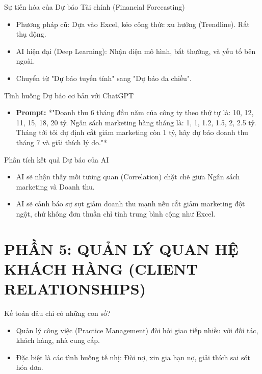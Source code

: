 \documentclass[aspectratio=169]{beamer}
\begin{document}
\begin{frame}{Sự tiến hóa của Dự báo Tài chính (Financial Forecasting)}
    \begin{itemize}
        \item Phương pháp cũ: Dựa vào Excel, kéo công thức xu hướng (Trendline). Rất thụ động.
        \item AI hiện đại (Deep Learning): Nhận diện mô hình, bất thường, và yếu tố bên ngoài.
        \item Chuyển từ "Dự báo tuyến tính" sang "Dự báo đa chiều".
    \end{itemize}
\end{frame}


\begin{frame}{Tình huống Dự báo cơ bản với ChatGPT}
    \begin{itemize}
        \item \textbf{Prompt:} *"Doanh thu 6 tháng đầu năm của công ty theo thứ tự là: 10, 12, 11, 15, 18, 20 tỷ. Ngân sách marketing hàng tháng là: 1, 1, 1.2, 1.5, 2, 2.5 tỷ. Tháng tới tôi dự định cắt giảm marketing còn 1 tỷ, hãy dự báo doanh thu tháng 7 và giải thích lý do."*
    \end{itemize}
\end{frame}


\begin{frame}{Phân tích kết quả Dự báo của AI}
    \begin{itemize}
        \item AI sẽ nhận thấy mối tương quan (Correlation) chặt chẽ giữa Ngân sách marketing và Doanh thu.
        \item AI sẽ cảnh báo sự sụt giảm doanh thu mạnh nếu cắt giảm marketing đột ngột, chứ không đơn thuần chỉ tính trung bình cộng như Excel.
    \end{itemize}
\end{frame}


\section{PHẦN 5: QUẢN LÝ QUAN HỆ KHÁCH HÀNG (CLIENT RELATIONSHIPS)}


\begin{frame}{Kế toán đâu chỉ có những con số?}
    \begin{itemize}
        \item Quản lý công việc (Practice Management) đòi hỏi giao tiếp nhiều với đối tác, khách hàng, nhà cung cấp.
        \item Đặc biệt là các tình huống tế nhị: Đòi nợ, xin gia hạn nợ, giải thích sai sót hóa đơn.
    \end{itemize}
\end{frame}
\end{document}
